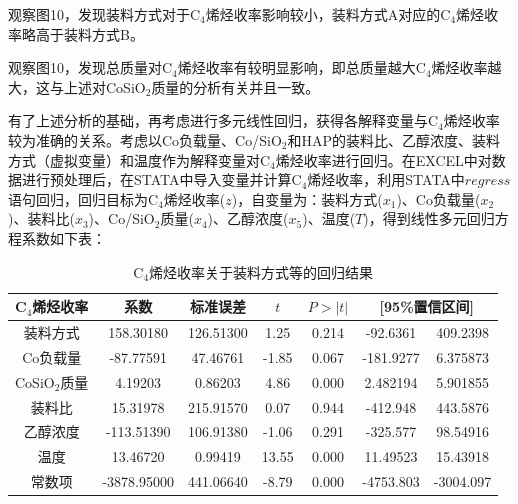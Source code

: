 \documentclass[a4paper,10.5pt]{ctexart}
\begin{document}
观察图10，发现装料方式对于C$_4$烯烃收率影响较小，装料方式A对应的C$_4$烯烃收率略高于装料方式B。

观察图10，发现总质量对C$_4$烯烃收率有较明显影响，即总质量越大C$_4$烯烃收率越大，这与上述对CoSiO$_2$质量的分析有关并且一致。
~\\
\par 有了上述分析的基础，再考虑进行多元线性回归，获得各解释变量与C$_4$烯烃收率较为准确的关系。考虑以Co负载量、Co/SiO$_2$和HAP的装料比、乙醇浓度、装料方式（虚拟变量）和温度作为解释变量对C$_4$烯烃收率进行回归。在EXCEL中对数据进行预处理后，在STATA中导入变量并计算C$_4$烯烃收率，利用STATA中$regress$语句回归，回归目标为C$_4$烯烃收率($z$)，自变量为：装料方式($x_1$)、Co负载量($x_2$)、装料比($x_3$)、Co/SiO$_2$质量($x_4$)、乙醇浓度($x_5$)、温度($T$)，得到线性多元回归方程系数如下表：
\begin{table}[htbp]
  \centering
  \caption{C$_4$烯烃收率关于装料方式等的回归结果}
    \begin{tabular}{ccccccc}
    \toprule[2pt]
    C$_4$烯烃收率 & 系数    & 标准误差  & $t$ & $P>|t|$ & \multicolumn{2}{p{10.225em}}{[95\%置信区间]} \\
    \midrule
    装料方式  & 158.30180  & 126.51300  & 1.25  & 0.214 & -92.6361 & 409.2398 \\
    Co负载量 & -87.77591  & 47.46761  & -1.85 & 0.067 & -181.9277 & 6.375873 \\
    CoSiO$_2$质量 & 4.19203  & 0.86203  & 4.86  & 0.000 & 2.482194 & 5.901855 \\
    装料比   & 15.31978  & 215.91570  & 0.07  & 0.944 & -412.948 & 443.5876 \\
    乙醇浓度  & -113.51390  & 106.91380  & -1.06 & 0.291 & -325.577 & 98.54916 \\
    温度    & 13.46720  & 0.99419  & 13.55 & 0.000 & 11.49523 & 15.43918 \\
    常数项   & -3878.95000  & 441.06640  & -8.79 & 0.000 & -4753.803 & -3004.097 \\
    \bottomrule[2pt]
    \end{tabular}%
  \label{tab:addlabel}%
\end{table}%
\end{document}
